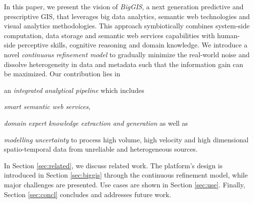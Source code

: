 \documentclass{sig-alternate-05-2015}
\begin{document}
In this paper, we present the vision of \textit{BigGIS}, a next generation 
predictive and prescriptive GIS, that leverages big data analytics, semantic
web technologies and visual analytics methodologies. This approach
symbiotically combines system-side computation, data storage and semantic web
services capabilities with human-side perceptive skills, cognitive reasoning
and domain knowledge. We introduce a novel \textit{continuous refinement model}
to gradually minimize the real-world noise and dissolve heterogeneity in data
and metadata such that the information gain can be maximized. Our contribution
lies in
\begin{inparaenum}[(1)]
  \item an \textit{integrated analytical pipeline} which includes
  \item \textit{smart semantic web services}, 
  \item \textit{domain expert knowledge extraction and generation }as
well as
  \item \textit{modelling uncertainty} to process
  high volume, high velocity and high dimensional spatio-temporal data from
  unreliable and heterogeneous sources.
\end{inparaenum}
In Section \ref{sec:related}, we discuss related work. The platform's design is
introduced in Section \ref{sec:biggis} through the continuous refinement model,
while major challenges are presented. Use cases are shown in Section
\ref{sec:use}. Finally, Section \ref{sec:concl} concludes and addresses future
work.
\end{document}
